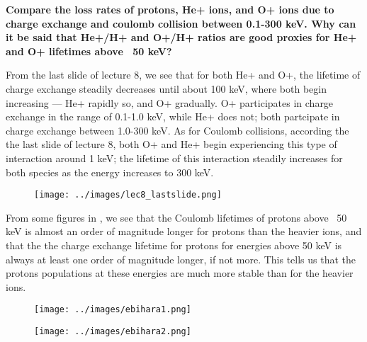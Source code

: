 \textbf{Compare the loss rates of protons, He+ ions, and O+ ions due to
charge exchange and coulomb collision between 0.1-300 keV. Why can it be
said that He+/H+ and O+/H+ ratios are good proxies for He+ and O+
lifetimes above ~50 keV?}


From the last slide of lecture 8, we see that for both He+ and O+, the
lifetime of charge exchange steadily decreases until about 100 keV,
where both begin increasing --- He+ rapidly so, and O+ gradually. O+
participates in charge exchange in the range of 0.1-1.0 keV, while He+
does not; both partcipate in charge exchange between 1.0-300 keV. As for
Coulomb collisions, according the the last slide of lecture 8, both O+
and He+ begin experiencing this type of interaction around 1 keV; the
lifetime of this interaction steadily increases for both species as the
energy increases to 300 keV.

\begin{figure}[ht]
  \centering
  \texttt{[image: ../images/lec8\_lastslide.png]}
  \label{fig1}
\end{figure}

From some figures in \citet{ebihara1998}, we see that the Coulomb lifetimes of
protons above ~50 keV is almost an order of magnitude longer for protons
than the heavier ions, and that the the charge exchange lifetime for
protons for energies above 50 keV is always at least one order of
magnitude longer, if not more. This tells us that the protons
populations at these energies are much more stable than for the heavier
ions. 

\begin{figure}[ht]
  \centering
  \texttt{[image: ../images/ebihara1.png]}
  \label{fig2}
\end{figure}
\begin{figure}[ht]
  \centering
  \texttt{[image: ../images/ebihara2.png]}
  \label{fig3}
\end{figure}

